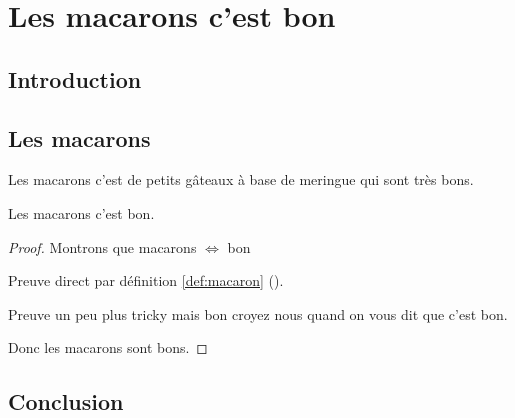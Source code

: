 
\chapter{Les macarons c'est bon}


\section{Introduction}

\section{Les macarons}
\begin{definition}[Macaron]
  Les macarons c'est de petits gâteaux à base de meringue qui sont très bons.
  \label{def:macaron}
\end{definition}

\begin{proposition}
  Les macarons c'est bon.
\end{proposition}

\begin{proof}
  Montrons que macarons $\Leftrightarrow$ bon
  
  \begin{myproof}
    Preuve direct par définition \ref{def:macaron} ().
  \end{myproof}
  \begin{myproof}
    Preuve un peu plus tricky mais bon croyez nous quand on vous dit que c'est bon.
  \end{myproof}
  Donc les macarons sont bons.
\end{proof}

\section{Conclusion}
